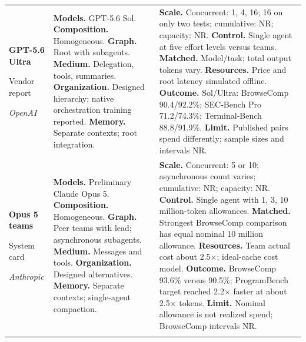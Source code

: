 \begin{longtable}{@{}>{\raggedright\arraybackslash}p{}>{\raggedright\arraybackslash}p{}>{\raggedright\arraybackslash}p{}@{}}
\textbf{GPT-5.6 Ultra}\par \citep{openai-gpt56-ultra}\par Vendor report\par\emph{OpenAI} & \textbf{Models.} GPT-5.6 Sol. \textbf{Composition.} Homogeneous. \textbf{Graph.} Root with subagents. \textbf{Medium.} Delegation, tools, summaries. \textbf{Organization.} Designed hierarchy; native orchestration training reported. \textbf{Memory.} Separate contexts; root integration. & \textbf{Scale.} Concurrent: 1, 4, 16; 16 on only two tests; cumulative: NR; capacity: NR. \textbf{Control.} Single agent at five effort levels versus teams. \textbf{Matched.} Model/task; total output tokens vary. \textbf{Resources.} Price and root latency simulated offline. \textbf{Outcome.} Sol/Ultra: BrowseComp 90.4/92.2\%; SEC-Bench Pro 71.2/74.3\%; Terminal-Bench 88.8/91.9\%. \textbf{Limit.} Published pairs spend differently; sample sizes and intervals NR. \\ \addlinespace[5pt]
\textbf{Opus 5 teams}\par \citep{opus5-card-multiagent}\par System card\par\emph{Anthropic} & \textbf{Models.} Preliminary Claude Opus 5. \textbf{Composition.} Homogeneous. \textbf{Graph.} Peer teams with lead; asynchronous subagents. \textbf{Medium.} Messages and tools. \textbf{Organization.} Designed alternatives. \textbf{Memory.} Separate contexts; single-agent compaction. & \textbf{Scale.} Concurrent: 5 or 10; asynchronous count varies; cumulative: NR; capacity: NR. \textbf{Control.} Single agent with 1, 3, 10 million-token allowances. \textbf{Matched.} Strongest BrowseComp comparison has equal nominal 10 million allowance. \textbf{Resources.} Team actual cost about 2.5$\times$; ideal-cache cost model. \textbf{Outcome.} BrowseComp 93.6\% versus 90.5\%; ProgramBench target reached 2.2$\times$ faster at about 2.5$\times$ tokens. \textbf{Limit.} Nominal allowance is not realized spend; BrowseComp intervals NR. \\ \addlinespace[5pt]

\end{longtable}
